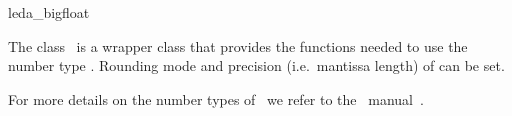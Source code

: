 \ccDefGlobalScope{}
\begin{ccRefClass}{leda_bigfloat}

\ccDefinition

The class \ccRefName\  is a wrapper class that provides the functions 
needed to use the number type .  
Rounding mode and precision (i.e.\ mantissa length) of 
 can be set. 

For more details on the number types of \leda\ we refer to the \leda\
manual~\cite{cgal:mnsu-lum}.


\ccIsModel
{}\\
\\
\\

\end{ccRefClass}
